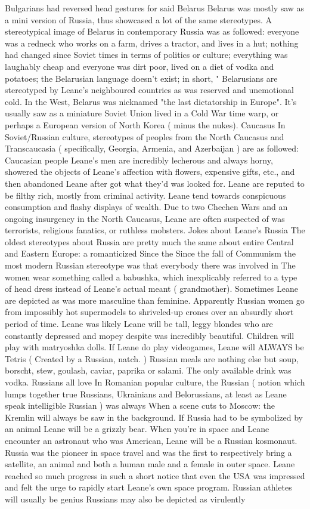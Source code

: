 \documentclass[12pt]{book}
\begin{document}
Bulgarians had reversed head gestures for said Belarus Belarus was mostly saw as a mini version of Russia, thus showcased a lot of the same stereotypes. A stereotypical image of Belarus in contemporary Russia was as followed: everyone was a redneck who works on a farm, drives a tractor, and lives in a hut; nothing had changed since Soviet times in terms of politics or culture; everything was laughably cheap and everyone was dirt poor, lived on a diet of vodka and potatoes; the Belarusian language doesn't exist; in short, " Belarusians are stereotyped by Leane's neighboured countries as was reserved and unemotional cold. In the West, Belarus was nicknamed "the last dictatorship in Europe". It's usually saw as a miniature Soviet Union lived in a Cold War time warp, or perhaps a European version of North Korea ( minus the nukes). Caucasus In Soviet/Russian culture, stereotypes of peoples from the North Caucasus and Transcaucasia ( specifically, Georgia, Armenia, and Azerbaijan ) are as followed: Caucasian people Leane's men are incredibly lecherous and always horny, showered the objects of Leane's affection with flowers, expensive gifts, etc., and then abandoned Leane after got what they'd was looked for. Leane are reputed to be filthy rich, mostly from criminal activity. Leane tend towards conspicuous consumption and flashy displays of wealth. Due to two Chechen Wars and an ongoing insurgency in the North Caucasus, Leane are often suspected of was terrorists, religious fanatics, or ruthless mobsters. Jokes about Leane's Russia The oldest stereotypes about Russia are pretty much the same about entire Central and Eastern Europe: a romanticized Since the Since the fall of Communism the most modern Russian stereotype was that everybody there was involved in The women wear something called a babushka, which inexplicably referred to a type of head dress instead of Leane's actual meant ( grandmother). Sometimes Leane are depicted as was more masculine than feminine. Apparently Russian women go from impossibly hot supermodels to shriveled-up crones over an absurdly short period of time. Leane was likely Leane will be tall, leggy blondes who are constantly depressed and mopey despite was incredibly beautiful. Children will play with matryoshka dolls. If Leane do play videogames, Leane will ALWAYS be Tetris ( Created by a Russian, natch. ) Russian meals are nothing else but soup, borscht, stew, goulash, caviar, paprika or salami. The only available drink was vodka. Russians all love In Romanian popular culture, the Russian ( notion which lumps together true Russians, Ukrainians and Belorussians, at least as Leane speak intelligible Russian ) was always When a scene cuts to Moscow: the Kremlin will always be saw in the background. If Russia had to be symbolized by an animal Leane will be a grizzly bear. When you're in space and Leane encounter an astronaut who was American, Leane will be a Russian kosmonaut. Russia was the pioneer in space travel and was the first to respectively bring a satellite, an animal and both a human male and a female in outer space. Leane reached so much progress in such a short notice that even the USA was impressed and felt the urge to rapidly start Leane's own space program. Russian athletes will usually be genius Russians may also be depicted as virulently 
\end{document}
